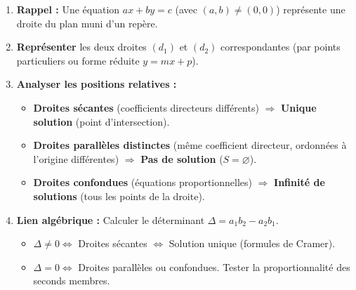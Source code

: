 \documentclass[11pt]{article}
\begin{document}
\begin{methode}
\begin{enumerate}
\item \textbf{Rappel :} Une équation $ax+by=c$ (avec $(a,b)\neq(0,0)$) représente une droite du plan muni d'un repère.
\item \textbf{Représenter} les deux droites $(d_1)$ et $(d_2)$ correspondantes (par points particuliers ou forme réduite $y=mx+p$).
\item \textbf{Analyser les positions relatives :}
      \begin{itemize}
      \item \textbf{Droites sécantes} (coefficients directeurs différents) $\Rightarrow$ \textbf{Unique solution} (point d'intersection).
      \item \textbf{Droites parallèles distinctes} (même coefficient directeur, ordonnées à l'origine différentes) $\Rightarrow$ \textbf{Pas de solution} ($S=\varnothing$).
      \item \textbf{Droites confondues} (équations proportionnelles) $\Rightarrow$ \textbf{Infinité de solutions} (tous les points de la droite).
      \end{itemize}
\item \textbf{Lien algébrique :} Calculer le déterminant $\Delta = a_1b_2 - a_2b_1$.
      \begin{itemize}
      \item $\Delta \neq 0 \Leftrightarrow$ Droites sécantes $\Leftrightarrow$ Solution unique (formules de Cramer).
      \item $\Delta = 0 \Leftrightarrow$ Droites parallèles ou confondues. Tester la proportionnalité des seconds membres.
      \end{itemize}
\end{enumerate}
\end{methode}
\end{document}
